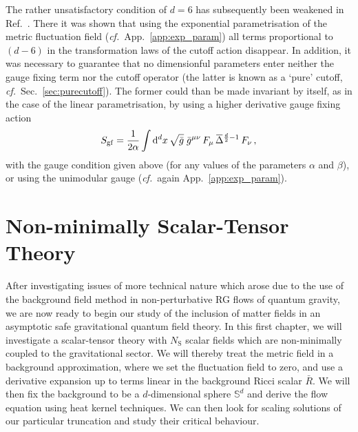 \documentclass[11pt]{book}
\newcommand{\overbar}[1]{\mkern 1.5mu\overline{\mkern-1.5mu#1\mkern-1.5mu}\mkern 1.5mu}
\newcommand\NS{ N_{\scriptscriptstyle{\mathrm{S}}} }
\newcommand\cf{\textit{cf.}\ }
\numberwithin{equation}{chapter}
\begin{document}
The rather unsatisfactory condition of $d=6$ has subsequently been weakened in
Ref.~\cite{Percacci:2016arh}. There it was shown that using the exponential
parametrisation of the metric fluctuation field (\cf App.~\ref{app:exp_param})
all terms proportional to $(d-6)$ in the transformation laws of the cutoff action
disappear. In addition, it was necessary to guarantee that no dimensionful
parameters enter neither the gauge fixing term nor the cutoff operator
(the latter is known as a `pure' cutoff, \cf Sec.~\ref{sec:purecutoff}).
The former could than
be made invariant by itself, as in the case of the linear parametrisation,
by using a higher derivative gauge fixing action
\begin{align}
  S_\mathrm{gf} = \frac{1}{2\alpha} \int \mathrm d^dx \, \sqrt{\bar g} \;
  \bar g^{\mu\nu} \, F_\mu \, \overbar \Delta^{\frac d2 - 1} \, F_\nu \,,
\end{align}
with the gauge condition given above (for any values of the parameters
$\alpha$ and $\beta$), or using the unimodular gauge (\cf again
App.~\ref{app:exp_param}).




\chapter{Non-minimally Scalar-Tensor Theory}
\label{ch:scalartensor}

After investigating issues of more technical nature which arose due to
the use of the background field method in non-perturbative RG flows
of quantum gravity, we are now ready to begin our study of the inclusion of
matter fields in an asymptotic safe gravitational quantum field theory.
In this first chapter, we will investigate a scalar-tensor theory
with $\NS$ scalar fields which are non-minimally coupled to the
gravitational sector. We will thereby treat the metric field in a background
approximation, where we set the fluctuation field to zero, and use
a derivative expansion up to terms linear in the background Ricci
scalar $\bar R$. We will then fix the background to be a $d$-dimensional
sphere $\mathbb S^d$ and derive the flow equation using heat kernel
techniques. We can then look for scaling solutions of our particular truncation
and study their critical behaviour.
\end{document}
